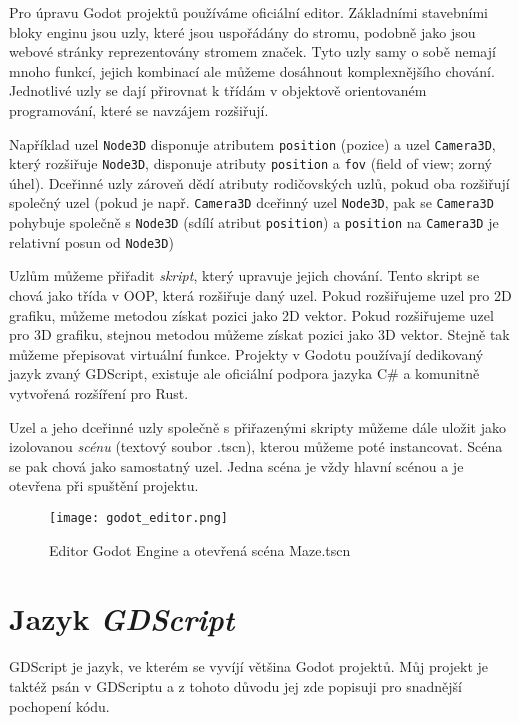 Pro úpravu Godot projektů používáme oficiální editor. Základními stavebními bloky enginu jsou uzly, které jsou uspořádány do stromu, podobně jako jsou webové stránky reprezentovány stromem značek. Tyto uzly samy o sobě nemají mnoho funkcí, jejich kombinací ale můžeme dosáhnout komplexnějšího chování. Jednotlivé uzly se dají přirovnat k třídám v objektově orientovaném programování, které se navzájem rozšiřují.

Například uzel \texttt{Node3D} disponuje atributem \texttt{position} (pozice) a uzel \texttt{Camera3D}, který rozšiřuje \texttt{Node3D}, disponuje atributy \texttt{position} a \texttt{fov} (field of view; zorný úhel). Dceřinné uzly zároveň dědí atributy rodičovských uzlů, pokud oba rozšiřují společný uzel (pokud je např. \texttt{Camera3D} dceřinný uzel \texttt{Node3D}, pak se \texttt{Camera3D} pohybuje společně s \texttt{Node3D} (sdílí atribut \texttt{position}) a \texttt{position} na \texttt{Camera3D} je relativní posun od \texttt{Node3D})

Uzlům můžeme přiřadit \textit{skript}, který upravuje jejich chování. Tento skript se chová jako třída v OOP, která rozšiřuje daný uzel. Pokud rozšiřujeme uzel pro 2D grafiku, můžeme metodou získat pozici jako 2D vektor. Pokud rozšiřujeme uzel pro 3D grafiku, stejnou metodou můžeme získat pozici jako 3D vektor. Stejně tak můžeme přepisovat virtuální funkce. Projekty v Godotu používají dedikovaný jazyk zvaný GDScript, existuje ale oficiální podpora jazyka C\# a komunitně vytvořená rozšíření pro Rust.

Uzel a jeho dceřinné uzly společně s přiřazenými skripty můžeme dále uložit jako izolovanou \textit{scénu} (textový soubor .tscn), kterou můžeme poté instancovat. Scéna se pak chová jako samostatný uzel. Jedna scéna je vždy hlavní scénou a je otevřena při spuštění projektu.

\begin{figure}[H]
  \centering
  \texttt{[image: godot\_editor.png]}
  \caption{Editor Godot Engine a otevřená scéna Maze.tscn}
  \label{godot_editor_maze_tscn}
\end{figure}

\section{Jazyk \textit{GDScript}}

GDScript je jazyk, ve kterém se vyvíjí většina Godot projektů. Můj projekt je taktéž psán v GDScriptu a z tohoto důvodu jej zde popisuji pro snadnější pochopení kódu.

